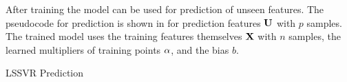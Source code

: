 After training the model can be used for prediction of unseen features. The pseudocode for prediction is shown in  for prediction features \(\vb{U}\) with \(p \) samples. The trained model uses the training features themselves \(\vb{X}\) with \(n \) samples, the learned multipliers of training points \(\vb{\alpha}\), and the bias \(b\).
\begin{algorithm}[H]
  \caption{LSSVR Prediction}\label{alg:lssvr_prediction}
  \begin{algorithmic}[1]
    \State{\(\Omega \gets [[]]\)} 

    \EndFor{}
    \EndFor{}
    \EndProcedure{}
  \end{algorithmic}
\end{algorithm}

